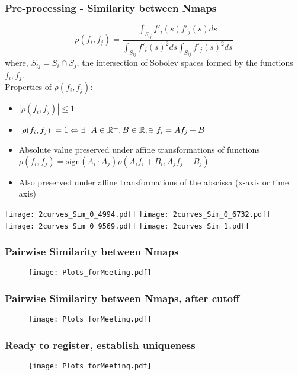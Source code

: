\documentclass[10pt,dvipsnames,table]{beamer}
\begin{document}
\begin{frame}
\frametitle{Pre-processing - Similarity between Nmaps }
\[ \rho(f_i, f_j) = \frac{\int _{S_{ij}}f'_i(s)f'_j(s) ds}{\int _{S_{ij}}f'_i(s)^2 ds \int _{S_{ij}}f'_j(s)^2 ds} \]
where, $S_{ij} = S_i \cap S_j$, the intersection of Sobolev spaces formed by the functions $f_i, f_j$.\\
Properties of $\rho(f_i, f_j)$:
\begin{itemize}
\item $|\rho(f_i, f_j)| \leq 1$
\item $|\rho(f_i, f_j)| = 1 \Leftrightarrow \exists \ \ A \in \mathbb{R} ^+, B \in \mathbb{R}, \ni f_i = Af_j + B$
\item Absolute value preserved under affine transformations of functions \\
$\rho(f_i, f_j) = \text{sign}(A_i\cdot A_j) \rho(A_if_i + B_i, A_jf_j + B_j)$
\item Also preserved under affine transformations of the abscissa (x-axis or time axis)
\end{itemize}
\end{frame}

\begin{frame}
\begin{center}
\texttt{[image: 2curves\_Sim\_0\_4994.pdf]}
\texttt{[image: 2curves\_Sim\_0\_6732.pdf]} \\
\texttt{[image: 2curves\_Sim\_0\_9569.pdf]}
\texttt{[image: 2curves\_Sim\_1.pdf]}
\end{center}
\end{frame}

\begin{frame}
\frametitle{Pairwise Similarity between Nmaps}
\begin{figure}
\texttt{[image: Plots\_forMeeting.pdf]}
\end{figure}
\end{frame}

\begin{frame}
\frametitle{Pairwise Similarity between Nmaps, after cutoff}
\begin{figure}
\texttt{[image: Plots\_forMeeting.pdf]}
\end{figure}
\end{frame}

\begin{frame}
\frametitle{Ready to register, establish uniqueness}
\begin{figure}
\texttt{[image: Plots\_forMeeting.pdf]}
\end{figure}
\end{frame}
\end{document}
